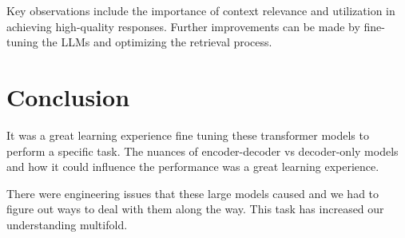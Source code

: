 \documentclass{article}
\begin{document}
Key observations include the importance of context relevance and utilization in achieving high-quality responses. Further improvements can be made by fine-tuning the LLMs and optimizing the retrieval process.

\section{Conclusion}

It was a great learning experience fine tuning these transformer models to perform a specific task. The nuances of encoder-decoder vs decoder-only models and how it could influence the performance was a great learning experience.

There were engineering issues that these large models caused and we had to figure out ways to deal with them along the way. This task has increased our understanding multifold.
\end{document}

